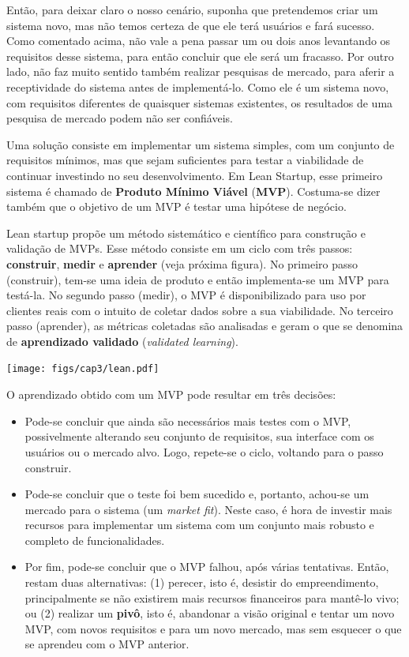 \documentclass[
  11pt,
  twoside]{book}
\let\origfigure\figure
\let\endorigfigure\endfigure
\renewenvironment{figure}[1][2] {
    \expandafter\origfigure\expandafter[!h]
} {
    \endorigfigure
}
\begin{document}
Então, para deixar claro o nosso cenário, suponha que pretendemos criar
um sistema novo, mas não temos certeza de que ele terá usuários e fará
sucesso. Como comentado acima, não vale a pena passar um ou dois anos
levantando os requisitos desse sistema, para então concluir que ele será
um fracasso. Por outro lado, não faz muito sentido também realizar
pesquisas de mercado, para aferir a receptividade do sistema antes de
implementá-lo. Como ele é um sistema novo, com requisitos diferentes de
quaisquer sistemas existentes, os resultados de uma pesquisa de mercado
podem não ser confiáveis.

Uma solução consiste em implementar um sistema simples, com um conjunto
de requisitos mínimos, mas que sejam suficientes para testar a
viabilidade de continuar investindo no seu desenvolvimento. Em Lean
Startup, esse primeiro sistema é chamado de \textbf{Produto Mínimo
Viável} (\textbf{MVP}). Costuma-se dizer também que o objetivo de um MVP
é testar uma hipótese de negócio.

Lean startup propõe um método sistemático e científico para construção e
validação de MVPs. Esse método consiste em um ciclo com três passos:
\textbf{construir}, \textbf{medir} e \textbf{aprender} (veja próxima
figura). No primeiro passo (construir), tem-se uma ideia de produto e
então implementa-se um MVP para testá-la. No segundo passo (medir), o
MVP é disponibilizado para uso por clientes reais com o intuito de
coletar dados sobre a sua viabilidade. No terceiro passo (aprender), as
métricas coletadas são analisadas e geram o que se denomina de
\textbf{aprendizado validado} (\emph{validated learning}).

\begin{figure}
\centering
\texttt{[image: figs/cap3/lean.pdf]}
\caption{Método Lean Startup para validação de MVPs}
\end{figure}

O aprendizado obtido com um MVP pode resultar em três decisões:

\begin{itemize}
\item
  Pode-se concluir que ainda são necessários mais testes com o MVP,
  possivelmente alterando seu conjunto de requisitos, sua interface com
  os usuários ou o mercado alvo. Logo, repete-se o ciclo, voltando para
  o passo construir.
\item
  Pode-se concluir que o teste foi bem sucedido e, portanto, achou-se um
  mercado para o sistema (um \emph{market fit}). Neste caso, é hora de
  investir mais recursos para implementar um sistema com um conjunto
  mais robusto e completo de funcionalidades.
\item
  Por fim, pode-se concluir que o MVP falhou, após várias tentativas.
  Então, restam duas alternativas: (1) perecer, isto é, desistir do
  empreendimento, principalmente se não existirem mais recursos
  financeiros para mantê-lo vivo; ou (2) realizar um \textbf{pivô}, isto
  é, abandonar a visão original e tentar um novo MVP, com novos
  requisitos e para um novo mercado, mas sem esquecer o que se aprendeu
  com o MVP anterior.
\end{itemize}
\end{document}
